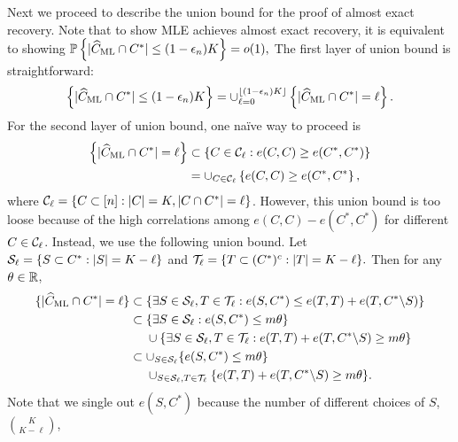 Next we proceed to  describe the union bound for the proof of almost exact recovery. Note that
to show MLE achieves almost exact recovery, it is equivalent to showing
$
\mathbb{P}\left\{  | \widehat{C}_{\rm ML}  \cap C^* | \le (1-\epsilon_n) K  \right\}  =o(1),
$
The first layer of union bound is straightforward:
\begin{equation}
\left\{ | \hat{C}_{\rm ML}  \cap C^* | \le (1-\epsilon_n) K  \right\} = \cup_{\ell=0}^{ \lfloor (1-\epsilon_n) K \rfloor } 
\left\{ | \hat{C}_{\rm ML}  \cap C^* | = \ell  \right\}.
\label{eq:union1}
\end{equation}
For the second layer of union bound, one na\"ive way to proceed is 
\begin{align*}
\left\{ | \widehat{C}_{\rm ML}  \cap C^* | = \ell  \right\} & \subset  \{  C\in {\mathcal{C}}_\ell: e(C, C) \geq e(C^*,C^*) \}  \\
& = \cup_{C \in {\mathcal{C}}_\ell } \left\{  e(C, C) \geq e(C^*,C^* \right\},
\end{align*} 
where ${\mathcal{C}}_\ell = \{ C \subset [n]: |C| = K,  |C\cap C^*| = \ell \}$. 
However, this union bound is too loose because of the high correlations 
among $e(C, C) - e(C^*, C^*)$ for different $C \in {\mathcal{C}}_\ell$. 
Instead, we use the following union bound.
Let ${\mathcal{S}}_\ell = \{  S \subset C^*: |S| =K-\ell \}$ and ${\mathcal{T}}_\ell = \{ T \subset (C^*)^c: |T| =K-\ell \}.$ Then for any $\theta\in{\mathbb{R}}$,
\begin{align}
 \{   | \widehat{C}_{\rm ML}  \cap C^* | = \ell \}  & \subset  \{  \exists S \in {\mathcal{S}}_\ell, T \in {\mathcal{T}}_\ell:   e(S, C^*)   \le e(T, T) +  e(T, C^*\backslash S)   \} \nonumber \\
 & \subset    \{  \exists S \in {\mathcal{S}}_\ell : e(S, C^*)  \leq m \theta  \} \nonumber \\
 & ~~~~ \cup \{ \exists  S \in {\mathcal{S}}_\ell, T \in {\mathcal{T}}_\ell:  e(T,  T) +  e(T, C^\ast \backslash S) \ge m \theta \} \nonumber \\
 & \subset \cup_{S \in {\mathcal{S}}_\ell} \{ e(S, C^*)  \leq m \theta  \}  \nonumber \\
 & ~~~~ \cup_{S \in {\mathcal{S}}_\ell, T \in {\mathcal{T}}_\ell} \{ e(T,  T) +  e(T, C^\ast \backslash S) \ge m \theta \}. \label{eq:union2}
\end{align}
Note that we single out $e(S, C^*)$ because the number of different choices of $S$, $\binom{K}{K-\ell}$,  
